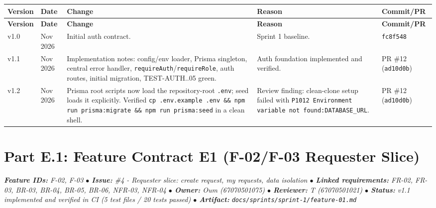 \documentclass[11pt,a4paper]{article}
\begin{document}
\vspace{0.3em}
\begin{longtable}{|>{\centering\arraybackslash}p{1.2cm}|>{\centering\arraybackslash}p{1.8cm}|>{\RaggedRight}p{6.6cm}|>{\RaggedRight}p{3.2cm}|>{\centering\arraybackslash}p{1.6cm}|}
\hline
\rowcolor{zenPale}\textbf{Version} & \textbf{Date} & \textbf{Change} & \textbf{Reason} & \textbf{Commit/PR} \\ \hline
\endfirsthead
\hline
\rowcolor{zenPale}\textbf{Version} & \textbf{Date} & \textbf{Change} & \textbf{Reason} & \textbf{Commit/PR} \\ \hline
\endhead
\hline
\endfoot
v1.0 & 10 Nov 2026 & Initial auth contract. & Sprint 1 baseline. & \texttt{fc8f548} \\ \hline
v1.1 & 10 Nov 2026 & Implementation notes: config/env loader, Prisma singleton, central error\allowbreak{} handler, \texttt{requireAuth}\allowbreak{}/\texttt{requireRole}, auth routes, initial\allowbreak{} migration, TEST\allowbreak -AUTH\allowbreak -01..05 green. & Auth foundation implemented and verified. & PR \#12 (\texttt{ad10d0b}) \\ \hline
v1.2 & 11 Nov 2026 & Prisma root scripts now load the repository-root \texttt{.\allowbreak env}; seed loads it explicitly. Verified \texttt{cp .\allowbreak env.\allowbreak example .\allowbreak env \&\& npm run prisma:\allowbreak migrate \&\& npm run prisma:\allowbreak seed} in a clean shell. & Review finding: clean-clone setup failed with \texttt{P1012 Environment variable not found:\allowbreak  DATABASE\_\allowbreak URL}. & PR \#12 (\texttt{ad10d0b}) \\ \hline
\end{longtable}
\vspace{0.3em}
\newpage
\section{Part E.1: Feature Contract E1 (F-02/F-03 Requester Slice)}\label{sec:part-e1}

\begin{tcolorbox}[colback=lightbg,colframe=secondary,arc=2mm,boxrule=0.8pt]\small\itshape
\textbf{Feature IDs:} F-02, F-03 \quad $\bullet$ \quad \textbf{Issue:} \#4 - Requester slice: create request, my requests, data isolation \quad $\bullet$ \quad \textbf{Linked requirements:} FR-02, FR-03, BR-03, BR-04, BR-05, BR-06, NFR-03, NFR-04 \quad $\bullet$ \quad \textbf{Owner:} Oum (67070501075) \quad $\bullet$ \quad \textbf{Reviewer:} T (67070501021) \quad $\bullet$ \quad \textbf{Status:} v1.1 implemented and verified in CI (5 test files / 20 tests passed) \quad $\bullet$ \quad \textbf{Artifact:} \texttt{docs/sprints/sprint-1/feature-01.md}
\end{tcolorbox}
\end{document}
